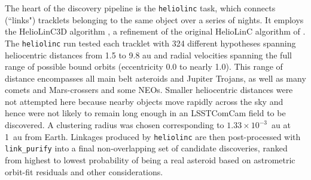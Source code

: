 The heart of the discovery \gls{pipeline} is the {\tt heliolinc} task, which connects (``links") tracklets belonging to the same object over a series of nights.
It employs the HelioLinC3D algorithm \citep{2020DPS....5221101E,2022DPS....5450404H}, a refinement of the original HelioLinC algorithm of \citet{2018AJ....156..135H}.
The {\tt heliolinc} run tested each \gls{tracklet} with 324 different hypotheses spanning heliocentric distances from 1.5 to 9.8 \gls{au} and radial velocities spanning the full range of possible bound orbits (eccentricity 0.0 to nearly 1.0).
This range of distance encompasses all main belt asteroids and Jupiter Trojans, as well as many comets and Mars-crossers and some \glspl{NEO}.
Smaller heliocentric distances were not attempted here because nearby objects move rapidly across the sky and hence were not likely to remain long enough in an \gls{LSSTComCam} field to be discovered.
A clustering radius was chosen corresponding to $1.33 \times 10^{-3}$~au at 1~au from Earth. Linkages produced by {\tt heliolinc} are then post-processed with {\tt link\_purify} into a final non-overlapping set of candidate discoveries, ranked from highest to lowest probability of being a real asteroid based on astrometric orbit-fit residuals and other considerations.
